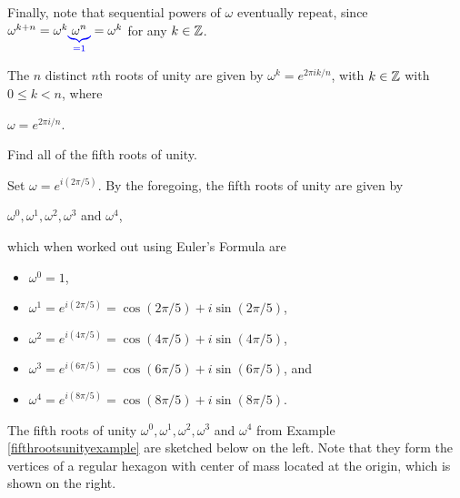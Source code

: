 \documentclass[11pt,fleqn,dvipsnames,usenames]{article}
\newcommand{\p}{\noindent}
\begin{document}
\p Finally, note that sequential powers of $\omega$ eventually repeat, since $\omega^{k+n} = \omega^{k}{\color{blue}\underbrace{\color{black}\omega^{n}}_{=1}} = \omega^{k}$ for any $k\in\mathbb{Z}$.
%
\begin{theorem}\label{rootsofunityclassification}
The $n$ distinct $n$th roots of unity are given by $\omega^{k} = e^{2\pi i k/n}$, with $k\in\mathbb{Z}$ with $0\leq k < n$, where
\begin{center}
$\omega = e^{2\pi i/n}$.
\end{center}
\end{theorem}


\begin{example}\label{fifthrootsunityexample}
Find all of the fifth roots of unity.
\end{example}
%
\begin{solution}
Set $\omega = e^{i(2\pi/5)}$.  By the foregoing, the fifth roots of unity are given by
\begin{center}
$\omega^{0}, \omega^{1}, \omega^{2},\omega^{3}$ and $\omega^{4}$,
\end{center}
which when worked out using Euler's Formula are
\begin{itemize}[\ ]
\item $\omega^{0} = 1$,
\item $\omega^{1} = e^{i(2\pi/5)} = \cos(2\pi/5) + i\sin(2\pi/5)$,
\item $\omega^{2} = e^{i(4\pi/5)} = \cos(4\pi/5) + i \sin(4\pi/5)$,
\item $\omega^{3} = e^{i(6\pi/5)} = \cos(6\pi/5) + i\sin(6\pi/5)$, and
\item $\omega^{4} = e^{i(8\pi/5)} = \cos(8\pi/5) + i\sin(8\pi/5)$.
\end{itemize}
\end{solution}
\vsp

\p The fifth roots of unity $\omega^{0}, \omega^{1}, \omega^{2},\omega^{3}$ and $\omega^{4}$ from Example \ref{fifthrootsunityexample} are sketched below on the left.  Note that they form the vertices of a regular hexagon with center of mass located at the origin, which is shown on the right.
\end{document}
